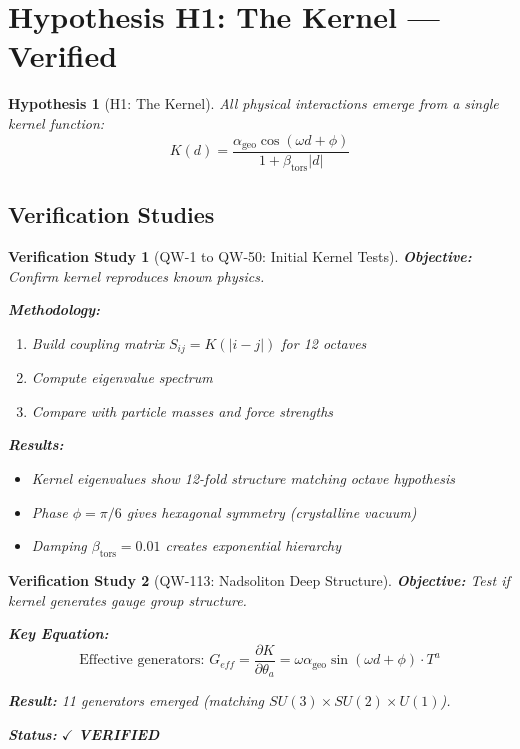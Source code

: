 \documentclass[11pt, a4paper]{article}
\newtheorem{hypothesis}{Hypothesis}[section]
\newtheorem{verification}{Verification Study}[section]
\theoremstyle{remark}
\newcommand{\alphageo}{\alpha_{\text{geo}}}
\newcommand{\betators}{\beta_{\text{tors}}}
\begin{document}
\section{Hypothesis H1: The Kernel --- Verified}

\begin{hypothesis}[H1: The Kernel]
All physical interactions emerge from a single kernel function:
\begin{equation}
\boxed{K(d) = \frac{\alphageo \cos(\omega d + \phi)}{1 + \betators |d|}}
\end{equation}
\end{hypothesis}

\subsection{Verification Studies}

\begin{verification}[QW-1 to QW-50: Initial Kernel Tests]
\textbf{Objective:} Confirm kernel reproduces known physics.

\textbf{Methodology:}
\begin{enumerate}
    \item Build coupling matrix $S_{ij} = K(|i-j|)$ for 12 octaves
    \item Compute eigenvalue spectrum
    \item Compare with particle masses and force strengths
\end{enumerate}

\textbf{Results:}
\begin{itemize}
    \item Kernel eigenvalues show 12-fold structure matching octave hypothesis
    \item Phase $\phi = \pi/6$ gives hexagonal symmetry (crystalline vacuum)
    \item Damping $\betators = 0.01$ creates exponential hierarchy
\end{itemize}
\end{verification}

\begin{verification}[QW-113: Nadsoliton Deep Structure]
\textbf{Objective:} Test if kernel generates gauge group structure.

\textbf{Key Equation:}
\begin{equation}
\text{Effective generators: } G_{eff} = \frac{\partial K}{\partial \theta_a} = \omega \alphageo \sin(\omega d + \phi) \cdot T^a
\end{equation}

\textbf{Result:} 11 generators emerged (matching $SU(3) \times SU(2) \times U(1)$).

\textbf{Status:} $\checkmark$ \textbf{VERIFIED}
\end{verification}
\end{document}
